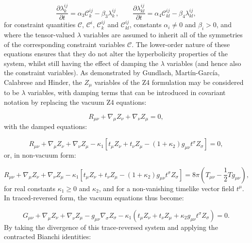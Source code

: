 \documentclass{article}
\begin{document}
\begin{equation}
\frac{\partial \lambda^{i j}_{k}}{\partial t} = \alpha_3 \mathcal{C}^{i j}_k - \beta_3 \lambda^{i j}_{k}, \qquad \frac{\partial \lambda^{i j}_{k l}}{\partial t} = \alpha_4 \mathcal{C}^{i j}_{k l} - \beta_4 \lambda^{i j}_{k l},
\end{equation}
for constraint quantities ${\mathcal{C}}$, ${\mathcal{C}^i}$, ${\mathcal{C}^{i j}_{k}}$ and ${\mathcal{C}^{i j}_{k l}}$, constants ${\alpha_i \neq 0}$ and ${\beta_i > 0}$, and where the tensor-valued ${\lambda}$ variables are assumed to inherit all of the symmetries of the corresponding constraint variables ${\mathcal{C}}$. The lower-order nature of these equations ensures that they do not alter the hyperbolicity properties of the system, whilst still having the effect of damping the ${\lambda}$ variables (and hence also the constraint variables). As demonstrated by Gundlach, Mart\'in-Garc\'ia, Calabrese and Hinder\cite{gundlach}, the ${Z_{\mu}}$ variables of the Z4 formulation may be considered to be ${\lambda}$ variables, with damping terms that can be introduced in covariant notation by replacing the vacuum Z4 equations:

\begin{equation}
R_{\mu \nu} + \nabla_{\mu} Z_{\nu} + \nabla_{\nu} Z_{\mu} = 0,
\end{equation}
with the damped equations:

\begin{equation}
R_{\mu \nu} + \nabla_{\mu} Z_{\nu} + \nabla_{\nu} Z_{\mu} - \kappa_1 \left[ t_{\mu} Z_{\nu} + t_{\nu} Z_{\mu} - \left( 1 + \kappa_2 \right) g_{\mu \nu} t^{\sigma} Z_{\sigma} \right] = 0,
\end{equation}
or, in non-vacuum form:

\begin{equation}
R_{\mu \nu} + \nabla_{\mu} Z_{\nu} + \nabla_{\nu} Z_{\mu} - \kappa_1 \left[ t_{\mu} Z_{\nu} + t_{\nu} Z_{\mu} - \left( 1 + \kappa_2 \right) g_{\mu \nu} t^{\sigma} Z_{\sigma} \right] = 8 \pi \left( T_{\mu \nu} - \frac{1}{2} T g_{\mu \nu} \right),
\end{equation}
for real constants ${\kappa_1 \geq 0}$ and ${\kappa_2}$, and for a non-vanishing timelike vector field ${t^{\mu}}$. In traced-reversed form, the vacuum equations thus become:

\begin{equation}
G_{\mu \nu} + \nabla_{\mu} Z_{\nu} + \nabla_{\nu} Z_{\mu} - g_{\mu \nu} \nabla_{\sigma} Z_{\sigma} - \kappa_1 \left( t_{\mu} Z_{\nu} + t_{\nu} Z_{\mu} + \kappa_2 g_{\mu \nu} t^{\sigma} Z_{\sigma} \right) = 0.
\end{equation}
By taking the divergence of this trace-reversed system and applying the contracted Bianchi identities:
\end{document}
